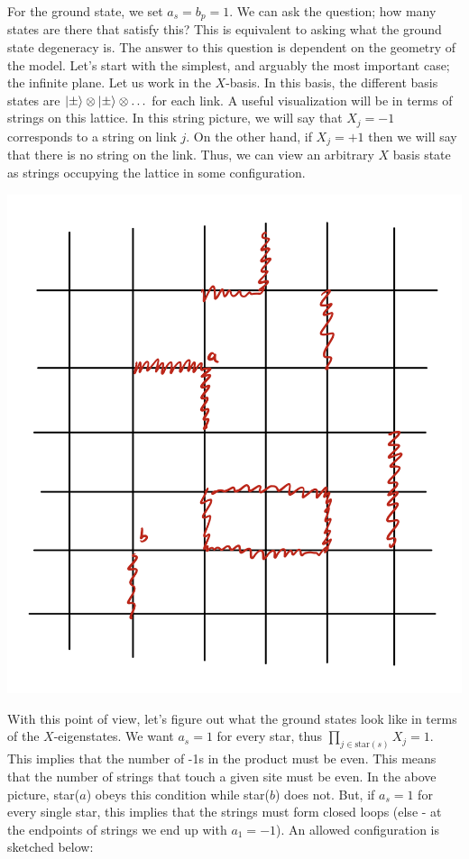 For the ground state, we set $a_s = b_p = 1$. We can ask the question; how many states are there that satisfy this? This is equivalent to asking what the ground state degeneracy is. The answer to this question is dependent on the geometry of the model. Let's start with the simplest, and arguably the most important case; the infinite plane. Let us work in the $X$-basis. In this basis, the different basis states are $\lvert \pm \rangle \otimes \lvert \pm \rangle \otimes \ldots$ for each link. A useful visualization will be in terms of strings on this lattice. In this string picture, we will say that $X_j = -1$ corresponds to a string on link $j$. On the other hand, if $X_j = +1$ then we will say that there is no string on the link. Thus, we can view an arbitrary $X$ basis state as strings occupying the lattice in some configuration.

\begin{center}
    \includegraphics[scale=0.4]{Lectures/Images/lec1-strings.png}
\end{center}

With this point of view, let's figure out what the ground states look like in terms of the $X$-eigenstates. We want $a_s = 1$ for every star, thus $\prod_{j \in \text{star}(s)}X_j = 1$. This implies that the number of -1s in the product must be even. This means that the number of strings that touch a given site must be even. In the above picture, star($a$) obeys this condition while star($b$) does not. But, if $a_s = 1$ for every single star, this implies that the strings must form closed loops (else - at the endpoints of strings we end up with $a_1 = -1$). An allowed configuration is sketched below:

